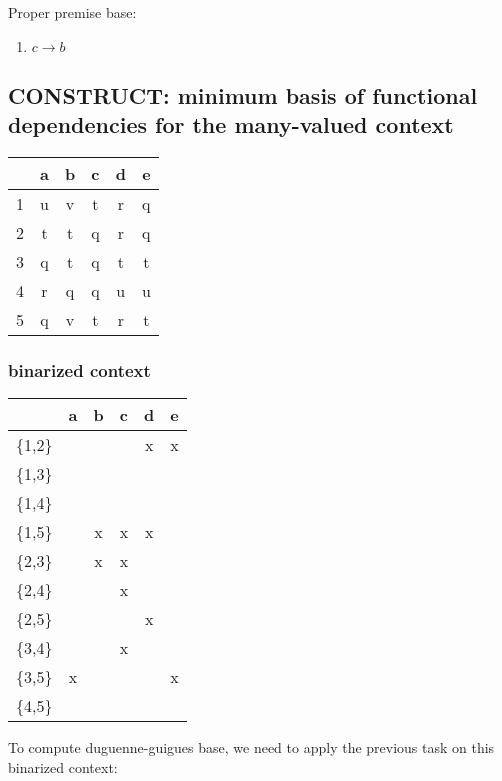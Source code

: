 Proper premise base:
\begin{enumerate}
\item $c \rightarrow b$
\end{enumerate}


\subsection{CONSTRUCT: minimum basis of functional dependencies for the many-valued context}

\begin{center}
\begin{tabular}{|c|c|c|c|c|c|}
\hline
 &a&b&c&d&e \\ \hline
1&u&v&t&r&q \\ \hline
2&t&t&q&r&q \\ \hline
3&q&t&q&t&t \\ \hline
4&r&q&q&u&u \\ \hline
5&q&v&t&r&t \\ \hline
\end{tabular}
\end{center}

\subsubsection{binarized context}


\begin{center}
\begin{tabular}{|c|c|c|c|c|c|}
\hline
 &a&b&c&d&e \\ \hline
\{1,2\}&&&&x&x \\ \hline
\{1,3\}&&&&& \\ \hline
\{1,4\}&&&&& \\ \hline
\{1,5\}&&x&x&x& \\ \hline
\{2,3\}&&x&x&& \\ \hline
\{2,4\}&&&x&& \\ \hline
\{2,5\}&&&&x& \\ \hline
\{3,4\}&&&x&& \\ \hline
\{3,5\}&x&&&&x \\ \hline
\{4,5\}&&&&& \\ \hline
\end{tabular}
\end{center}

To compute duguenne-guigues base, 
we need to apply the previous task on this binarized context:

